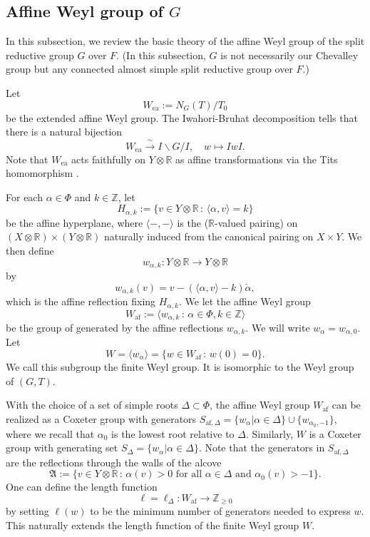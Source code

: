 \documentclass[10pt, letterpaper]{amsart}
\theoremstyle{plain}
\theoremstyle{definition}
\numberwithin{equation}{section}
\newcommand{\R}{\mathbb{R}}
\newcommand{\Z}{\mathbb{Z}}
\newcommand{\alphac}{{\check{\alpha}}}
\newcommand{\Aff}{\operatorname{Aff}}
\newcommand{\af}{\mathrm{af}}
\newcommand{\ea}{\mathrm{ea}}
\newcommand{\la}{\langle}
\newcommand{\ra}{\rangle}
\newcommand{\st}{\,:\,}
\begin{document}
\subsection{Affine Weyl group of $G$}\label{SS:affine_Weyl_linear_group}
In this subsection, we review the basic theory of the affine Weyl group of the split reductive group $G$ over $F$. (In this subsection, $G$ is not necessarily our Chevalley group but any connected almost simple split reductive group over $F$.)

Let
\[
W_{\ea}:=N_G(T)\slash T_0
\]
be the extended affine Weyl group. The Iwahori-Bruhat decomposition tells that there is a natural bijection
\begin{equation}\label{E:Iwahori-Bruhat_decomp_reductive}
W_{\ea}\xrightarrow{\;\sim\;} I\backslash G\slash I,\quad w\mapsto IwI.
\end{equation}
Note that $W_{\ea}$ acts faithfully on $Y\otimes \R$ as affine transformations via the Tits homomorphism \cite[page 32]{T79}. %

For each $\alpha\in\Phi$ and $k\in\Z$, let
\[
H_{\alpha, k}:=\{v\in Y\otimes \R\st \la\alpha, v\ra=k\}
\]
be the affine hyperplane, where $\la-,-\ra$ is the ($\R$-valued pairing) on $(X\otimes\R)\times (Y\otimes \R)$ naturally induced from the canonical pairing on $X\times Y$. We then define
\[
w_{\alpha, k}: Y\otimes \R\longrightarrow Y\otimes \R
\]
by
\[
w_{\alpha, k}(v)=v-(\la\alpha, v\ra-k)\alphac,
\]
which is the affine reflection fixing $H_{\alpha, k}$. We let the affine Weyl group
\[
W_{\af}:=\la w_{\alpha, k}\st \alpha\in\Phi, k\in\Z\ra
\]
be the group of generated by the affine reflections $w_{\alpha, k}$. We will write $w_{\alpha}=w_{\alpha,0}$. Let
\[
W=\la w_{\alpha}\ra=\{w\in W_{\af}\st w(0)=0\}.
\]
We call this subgroup the finite Weyl group. It is isomorphic to the Weyl group of $(G,T)$.

With the choice of a set of simple roots $\Delta\subset \Phi$, the affine Weyl group $W_{\af}$ can be realized as a Coxeter group with generators $S_{\af,\Delta}=\{w_{\alpha}|\alpha\in \Delta\}\cup\{w_{\alpha_{0},-1}\}$, where we recall that $\alpha_0$ is the lowest root relative to $\Delta$. Similarly, $W$ is a Coxeter group with generating set $S_{\Delta}=\{w_{\alpha}|\alpha\in \Delta\}$. Note that the generators in $S_{\af,\Delta}$ are the reflections through the walls of the alcove 
\[
\mathfrak{A}:=\{v\in Y\otimes \mathbb{R}\st\alpha(v)>0 \text{ for all }\alpha\in \Delta\text{ and }\alpha_{0}(v)>-1\}.
\]
One can define the length function
\[
\ell=\ell_{\Delta}:W_{\af}\longrightarrow\Z_{\geq 0}
\]
by setting $\ell(w)$ to be the minimum number of generators needed to express $w$. This naturally extends the length function of the finite Weyl group $W$. 
\end{document}
